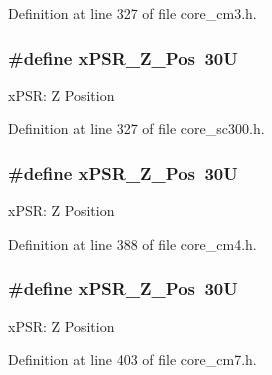 Definition at line 327 of file core\+\_\+cm3.\+h.

\subsubsection[{\texorpdfstring{x\+P\+S\+R\+\_\+\+Z\+\_\+\+Pos}{xPSR_Z_Pos}}]{\setlength{\rightskip}{0pt plus 5cm}\#define x\+P\+S\+R\+\_\+\+Z\+\_\+\+Pos~30U}\hypertarget{group___c_m_s_i_s___c_o_r_e_ga5869dd608eea73c80f0567d781d2230b}{}\label{group___c_m_s_i_s___c_o_r_e_ga5869dd608eea73c80f0567d781d2230b}
x\+P\+SR\+: Z Position 

Definition at line 327 of file core\+\_\+sc300.\+h.

\subsubsection[{\texorpdfstring{x\+P\+S\+R\+\_\+\+Z\+\_\+\+Pos}{xPSR_Z_Pos}}]{\setlength{\rightskip}{0pt plus 5cm}\#define x\+P\+S\+R\+\_\+\+Z\+\_\+\+Pos~30U}\hypertarget{group___c_m_s_i_s___c_o_r_e_ga5869dd608eea73c80f0567d781d2230b}{}\label{group___c_m_s_i_s___c_o_r_e_ga5869dd608eea73c80f0567d781d2230b}
x\+P\+SR\+: Z Position 

Definition at line 388 of file core\+\_\+cm4.\+h.

\subsubsection[{\texorpdfstring{x\+P\+S\+R\+\_\+\+Z\+\_\+\+Pos}{xPSR_Z_Pos}}]{\setlength{\rightskip}{0pt plus 5cm}\#define x\+P\+S\+R\+\_\+\+Z\+\_\+\+Pos~30U}\hypertarget{group___c_m_s_i_s___c_o_r_e_ga5869dd608eea73c80f0567d781d2230b}{}\label{group___c_m_s_i_s___c_o_r_e_ga5869dd608eea73c80f0567d781d2230b}
x\+P\+SR\+: Z Position 

Definition at line 403 of file core\+\_\+cm7.\+h.

